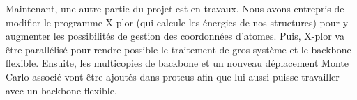 \documentclass[a4paper,11pt]{article}
\begin{document}
\begin{spacing}{1.0}
  Maintenant, une autre partie du projet est en travaux. Nous avons entrepris de modifier le programme X-plor (qui calcule les énergies de nos structures) pour y augmenter les possibilités de gestion des coordonnées d'atomes. Puis, X-plor va être parallélisé pour rendre possible le traitement de gros système et le backbone flexible. Ensuite, les multicopies de backbone et un nouveau déplacement Monte Carlo associé vont être ajoutés dans proteus afin que lui aussi puisse travailler avec un backbone flexible.

\end{spacing}
\end{document}
